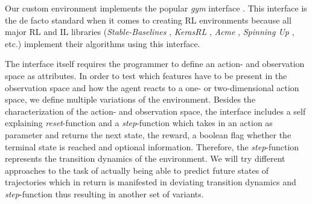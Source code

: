 Our custom environment implements the popular \textit{gym} interface \cite[]{gym}. This interface is the de facto standard when it comes to creating RL environments because all major RL and IL libraries (\textit{Stable-Baselines} \cite[]{stable-baselines3}, \textit{KerasRL} \cite[]{plappert2016kerasrl}, \textit{Acme} \cite[]{hoffman2020acme}, \textit{Spinning Up} \cite[]{SpinningUp2018}, etc.) implement their algorithms using this interface.
\par
The interface itself requires the programmer to define an action- and observation space as attributes. In order to test which features have to be present in the observation space and how the agent reacts to a one- or two-dimensional action space, we define multiple variations of the environment. Besides the characterization of the action- and observation space, the interface includes a self explaining \textit{reset}-function and a \textit{step}-function which takes in an action as parameter and returns the next state, the reward, a boolean flag whether the terminal state is reached and optional information. Therefore, the \textit{step}-function represents the transition dynamics of the environment. We will try different approaches to the task of actually being able to predict future states of trajectories which in return is manifested in deviating transition dynamics and \textit{step}-function thus resulting in another set of variants.

